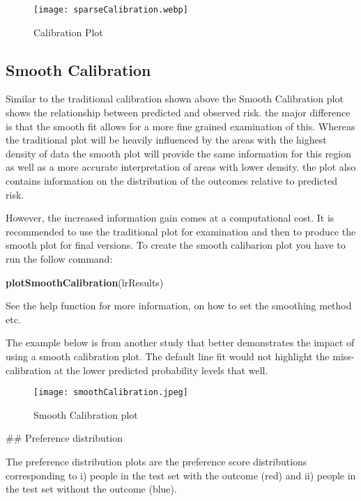 \documentclass[
]{article}
\newenvironment{Shaded}{\begin{snugshade}}{\end{snugshade}}
\newcommand{\FunctionTok}[1]{\textcolor[rgb]{0.13,0.29,0.53}{\textbf{#1}}}
\newcommand{\NormalTok}[1]{#1}
\begin{document}
\begin{figure}
\centering
\texttt{[image: sparseCalibration.webp]}
\caption{Calibration Plot}
\end{figure}

\newpage

\hypertarget{smooth-calibration}{%
\subsection{Smooth Calibration}\label{smooth-calibration}}

Similar to the traditional calibration shown above the Smooth
Calibration plot shows the relationship between predicted and observed
risk. the major difference is that the smooth fit allows for a more fine
grained examination of this. Whereas the traditional plot will be
heavily influenced by the areas with the highest density of data the
smooth plot will provide the same information for this region as well as
a more accurate interpretation of areas with lower density. the plot
also contains information on the distribution of the outcomes relative
to predicted risk.

However, the increased information gain comes at a computational cost.
It is recommended to use the traditional plot for examination and then
to produce the smooth plot for final versions. To create the smooth
calibarion plot you have to run the follow command:

\begin{Shaded}
\begin{Highlighting}[]
\FunctionTok{plotSmoothCalibration}\NormalTok{(lrResults)}
\end{Highlighting}
\end{Shaded}

See the help function for more information, on how to set the smoothing
method etc.

The example below is from another study that better demonstrates the
impact of using a smooth calibration plot. The default line fit would
not highlight the miss-calibration at the lower predicted probability
levels that well.

\begin{figure}
\centering
\texttt{[image: smoothCalibration.jpeg]}
\caption{Smooth Calibration plot}
\end{figure}

\newpage

\#\# Preference distribution

The preference distribution plots are the preference score distributions
corresponding to i) people in the test set with the outcome (red) and
ii) people in the test set without the outcome (blue).
\end{document}

